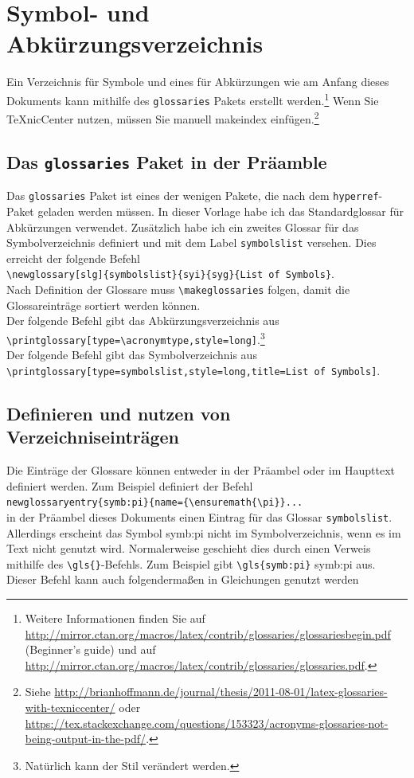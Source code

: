 \documentclass[a4paper,12pt]{scrartcl} %
\begin{document}
\section{Symbol- und Abkürzungsverzeichnis}
Ein Verzeichnis für Symbole und eines für Abkürzungen wie am Anfang dieses Dokuments kann mithilfe des \texttt{glossaries} Pakets erstellt werden.\footnote{Weitere Informationen finden Sie auf \url{http://mirror.ctan.org/macros/latex/contrib/glossaries/glossariesbegin.pdf} (Beginner's guide) und auf \url{http://mirror.ctan.org/macros/latex/contrib/glossaries/glossaries.pdf}.} Wenn Sie TeXnicCenter nutzen, müssen Sie manuell makeindex einfügen.\footnote{Siehe \url{http://brianhoffmann.de/journal/thesis/2011-08-01/latex-glossaries-with-texniccenter/} oder \url{https://tex.stackexchange.com/questions/153323/acronyms-glossaries-not-being-output-in-the-pdf/}.}

\subsection{Das \texttt{glossaries} Paket in der Präamble}
Das \texttt{glossaries} Paket ist eines der wenigen Pakete, die nach dem \texttt{hyperref}-Paket geladen werden müssen. In dieser Vorlage habe ich das Standardglossar für Abkürzungen verwendet. Zusätzlich habe ich ein zweites Glossar für das Symbolverzeichnis definiert und mit dem Label \texttt{symbolslist} versehen. Dies erreicht der folgende Befehl\\
\verb|\newglossary[slg]{symbolslist}{syi}{syg}{List of Symbols}|.\\

Nach Definition der Glossare muss \verb|\makeglossaries| folgen, damit die Glossareinträge sortiert werden können.\\

Der folgende Befehl gibt das Abkürzungsverzeichnis aus\\
\verb|\printglossary[type=\acronymtype,style=long]|.\footnote{Natürlich kann der Stil verändert werden.}\\
Der folgende Befehl gibt das Symbolverzeichnis aus\\
\verb|\printglossary[type=symbolslist,style=long,title=List of Symbols]|.

\subsection{Definieren und nutzen von Verzeichniseinträgen}
Die Einträge der Glossare können entweder in der Präambel oder im Haupttext definiert werden. Zum Beispiel definiert der Befehl\\
\verb|newglossaryentry{symb:pi}{name={\ensuremath{\pi}}...|\\
in der Präambel dieses Dokuments einen Eintrag für das Glossar \texttt{symbolslist}. Allerdings erscheint das Symbol \gls{symb:pi} nicht im Symbolverzeichnis, wenn es im Text nicht genutzt wird. Normalerweise geschieht dies durch einen Verweis mithilfe des \verb|\gls{}|-Befehls. Zum Beispiel gibt \verb|\gls{symb:pi}| \gls{symb:pi} aus. Dieser Befehl kann auch folgendermaßen in Gleichungen genutzt werden
\end{document}
